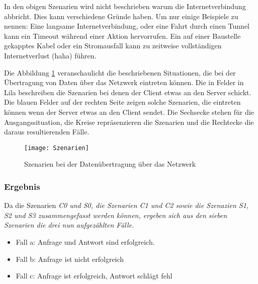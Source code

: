 In den obigen Szenarien wird nicht beschrieben warum die Internetverbindung abbricht. Dies kann verschiedene Gründe haben. Um nur einige Beispiele zu nennen: Eine langsame Internetverbindung, oder eine Fahrt durch einen Tunnel kann ein Timeout während einer Aktion hervorrufen. Ein auf einer Baustelle gekapptes Kabel oder ein Stromausfall kann zu zeitweise vollständigen Internetverlust (haha) führen.

Die Abbildung \ref{fig:szenarien} veranschaulicht die beschriebenen Situationen, die bei der Übertragung von Daten über das Netzwerk eintreten können. Die in Felder in Lila beschreiben die Szenarien bei denen der Client etwas an den Server schickt. Die blauen Felder auf der rechten Seite zeigen solche Szenarien, die eintreten können wenn der Server etwas an den Client sendet.
Die Sechsecke stehen für die Ausgangssituation, die Kreise repräsenzieren die Szenarien und die Rechtecke die daraus resultierenden Fälle.
\begin{figure}[H]
  \centering
  \texttt{[image: Szenarien]}
  \grayRule
  \caption{Szenarien bei der Datenübertragung über das Netzwerk}
  \label{fig:szenarien}
\end{figure}

%
%
\subsubsection*{Ergebnis}
Da die Szenarien \it{C0} und \it{S0}, die Szenarien \it{C1} und \it{C2} sowie die Szenazien \it{S1}, \it{S2} und \it{S3} zusammengefasst werden können, ergeben sich aus den sieben Szenarien die drei nun aufgezählten Fälle.
\begin{itemize}
  \item Fall a: Anfrage und Antwort sind erfolgreich.
  \item Fall b: Anfrage ist nicht erfolgreich
  \item Fall c: Anfrage ist erfolgreich, Antwort schlägt fehl
\end{itemize}